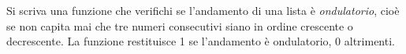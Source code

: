 \begin{Exercise}[label={ex:ondulatorio}]
    Si scriva una funzione che verifichi se l'andamento di una lista è \emph{ondulatorio}, cioè se non 
    capita mai che tre numeri consecutivi siano in ordine crescente o decrescente. La funzione restituisce 1
    se l'andamento è ondulatorio, 0 altrimenti.
\end{Exercise}

\begin{Answer}[ref={ex:ondulatorio}]
  	
\end{Answer}